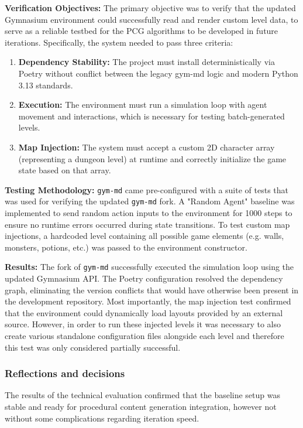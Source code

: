 \textbf{Verification Objectives:} The primary objective was to verify that the updated Gymnasium environment could successfully read and render custom level data, to serve as a reliable testbed for the PCG algorithms to be developed in future iterations.
Specifically, the system needed to pass three criteria:
\begin{enumerate}
	\item \textbf{Dependency Stability:} The project must install deterministically via Poetry without conflict between the legacy gym-md logic and modern Python 3.13 standards.
	\item \textbf{Execution:} The environment must run a simulation loop with agent movement and interactions, which is necessary for testing batch-generated levels.
	\item \textbf{Map Injection:} The system must accept a custom 2D character array (representing a dungeon level) at runtime and correctly initialize the game state based on that array.
\end{enumerate}

\textbf{Testing Methodology:} \texttt{gym-md} came pre-configured with a suite of tests that was used for verifying the updated \texttt{gym-md} fork.
A "Random Agent" baseline was implemented to send random action inputs to the environment for 1000 steps to ensure no runtime errors occurred during state transitions.
To test custom map injections, a hardcoded level containing all possible game elements (e.g. walls, monsters, potions, etc.) was passed to the environment constructor.

\textbf{Results:} The fork of \texttt{gym-md} successfully executed the simulation loop using the updated Gymnasium API.
The Poetry configuration resolved the dependency graph, eliminating the version conflicts that would have otherwise been present in the development repository.
Most importantly, the map injection test confirmed that the environment could dynamically load layouts provided by an external source. However, in order to run these injected levels it was necessary 
to also create various standalone configuration files alongside each level and therefore this test was only considered partially successful.

\subsubsection{Reflections and decisions}
The results of the technical evaluation confirmed that the baseline setup was stable and ready for procedural content generation integration, however not without some complications regarding iteration speed.

